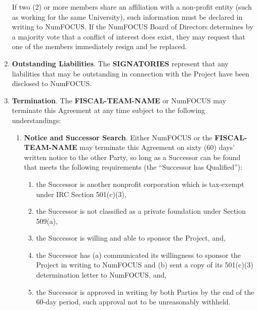 \documentclass[english,letterpaper,12pt]{article}
\newcommand{\signatories}{\textbf{SIGNATORIES}}
\newcommand{\fiscalteam}{\textbf{FISCAL-TEAM-NAME}}
\begin{document}
\begin{enumerate}[label=\arabic*.,ref=\S~\arabic*]
  If two (2) or more members share an affiliation with a non-profit entity
  (such as working for the same University), such information must be declared
  in writing to NumFOCUS. If the NumFOCUS Board of Directors determines by a
  majority vote that a conflict of interest does exist, they may request that
  one of the members immediately resign and be replaced.

\item \textbf{Outstanding Liabilities}. The \signatories{} represent that any
  liabilities that may be outstanding in connection with the Project have been
  disclosed to NumFOCUS.

\item \textbf{Termination}. \label{Termination} The \fiscalteam{} or
  NumFOCUS may terminate this Agreement at any time subject to the following
  understandings:

\begin{enumerate}[label=\alph*.,ref=\theenumi(\arabic*)]

\item \textbf{Notice and Successor Search}. Either NumFOCUS or the
  \fiscalteam{} may terminate this Agreement on sixty (60) days' written
  notice to the other Party, so long as a Successor can be found that meets the
  following requirements (the ``Successor has Qualified''):


\begin{enumerate}[label=\roman*.,ref=\theenumi(\alph{enumii})(\roman*)]
  
\item the Successor is another nonprofit corporation which is tax-exempt under
  IRC Section 501(c)(3),
  
\item the Successor is not classified as a private foundation under Section
  509(a),
  
\item the Successor is willing and able to sponsor the Project, and,
  
\item the Successor has (a) communicated its willingness to sponsor the Project
  in writing to NumFOCUS and (b) sent a copy of its 501(c)(3) determination
  letter to NumFOCUS, and,
  
\item the Successor is approved in writing by both Parties by the end of the
  60-day period, such approval not to be unreasonably withheld.
  
\end{enumerate}


\end{enumerate}
\end{enumerate}
\end{document}

